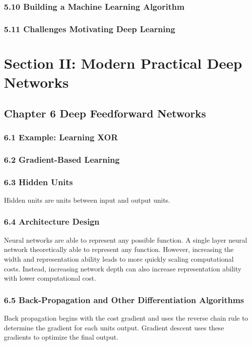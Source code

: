 \documentclass[a4paper]{report}
\begin{document}
\subsection{5.10 Building a Machine Learning Algorithm}
\subsection{5.11 Challenges Motivating Deep Learning}

\chapter{Section II: Modern Practical Deep Networks}
\section{Chapter 6 Deep Feedforward Networks}
\subsection{6.1 Example: Learning XOR}
\subsection{6.2 Gradient-Based Learning}

\subsection{6.3 Hidden Units}
Hidden units are units between input and output units.

\subsection{6.4 Architecture Design}
Neural networks are able to represent any possible function. A single layer neural network theoretically able to represent any function. However, increasing the width and representation ability leads to more quickly scaling computational costs. Instead, increasing network depth can also increase representation ability with lower computational cost.\\

\subsection{6.5 Back-Propagation and Other Differentiation Algorithms}
Back propagation begins with the cost gradient and uses the reverse chain rule to determine the gradient for each units output. Gradient descent uses these gradients to optimize the final output.
\end{document}

